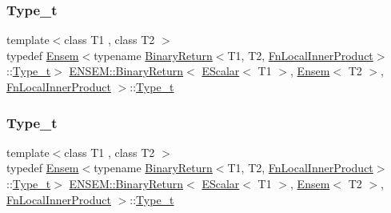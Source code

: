 \subsubsection{\texorpdfstring{Type\_t}{Type\_t}\hspace{0.1cm}{\footnotesize\ttfamily [1/2]}}
{\footnotesize\ttfamily template$<$class T1 , class T2 $>$ \\
typedef \mbox{\hyperlink{classENSEM_1_1Ensem}{Ensem}}$<$typename \mbox{\hyperlink{structENSEM_1_1BinaryReturn}{Binary\+Return}}$<$T1, T2, \mbox{\hyperlink{structENSEM_1_1FnLocalInnerProduct}{Fn\+Local\+Inner\+Product}}$>$\+::\mbox{\hyperlink{structENSEM_1_1BinaryReturn_3_01EScalar_3_01T1_01_4_00_01Ensem_3_01T2_01_4_00_01FnLocalInnerProduct_01_4_ae42ca536bfa1a7ec2f82fdf57061f99a}{Type\+\_\+t}}$>$ \mbox{\hyperlink{structENSEM_1_1BinaryReturn}{E\+N\+S\+E\+M\+::\+Binary\+Return}}$<$ \mbox{\hyperlink{classENSEM_1_1EScalar}{E\+Scalar}}$<$ T1 $>$, \mbox{\hyperlink{classENSEM_1_1Ensem}{Ensem}}$<$ T2 $>$, \mbox{\hyperlink{structENSEM_1_1FnLocalInnerProduct}{Fn\+Local\+Inner\+Product}} $>$\+::\mbox{\hyperlink{structENSEM_1_1BinaryReturn_3_01EScalar_3_01T1_01_4_00_01Ensem_3_01T2_01_4_00_01FnLocalInnerProduct_01_4_ae42ca536bfa1a7ec2f82fdf57061f99a}{Type\+\_\+t}}}

\mbox{\label{structENSEM_1_1BinaryReturn_3_01EScalar_3_01T1_01_4_00_01Ensem_3_01T2_01_4_00_01FnLocalInnerProduct_01_4_ae42ca536bfa1a7ec2f82fdf57061f99a}} 
\subsubsection{\texorpdfstring{Type\_t}{Type\_t}\hspace{0.1cm}{\footnotesize\ttfamily [2/2]}}
{\footnotesize\ttfamily template$<$class T1 , class T2 $>$ \\
typedef \mbox{\hyperlink{classENSEM_1_1Ensem}{Ensem}}$<$typename \mbox{\hyperlink{structENSEM_1_1BinaryReturn}{Binary\+Return}}$<$T1, T2, \mbox{\hyperlink{structENSEM_1_1FnLocalInnerProduct}{Fn\+Local\+Inner\+Product}}$>$\+::\mbox{\hyperlink{structENSEM_1_1BinaryReturn_3_01EScalar_3_01T1_01_4_00_01Ensem_3_01T2_01_4_00_01FnLocalInnerProduct_01_4_ae42ca536bfa1a7ec2f82fdf57061f99a}{Type\+\_\+t}}$>$ \mbox{\hyperlink{structENSEM_1_1BinaryReturn}{E\+N\+S\+E\+M\+::\+Binary\+Return}}$<$ \mbox{\hyperlink{classENSEM_1_1EScalar}{E\+Scalar}}$<$ T1 $>$, \mbox{\hyperlink{classENSEM_1_1Ensem}{Ensem}}$<$ T2 $>$, \mbox{\hyperlink{structENSEM_1_1FnLocalInnerProduct}{Fn\+Local\+Inner\+Product}} $>$\+::\mbox{\hyperlink{structENSEM_1_1BinaryReturn_3_01EScalar_3_01T1_01_4_00_01Ensem_3_01T2_01_4_00_01FnLocalInnerProduct_01_4_ae42ca536bfa1a7ec2f82fdf57061f99a}{Type\+\_\+t}}}



